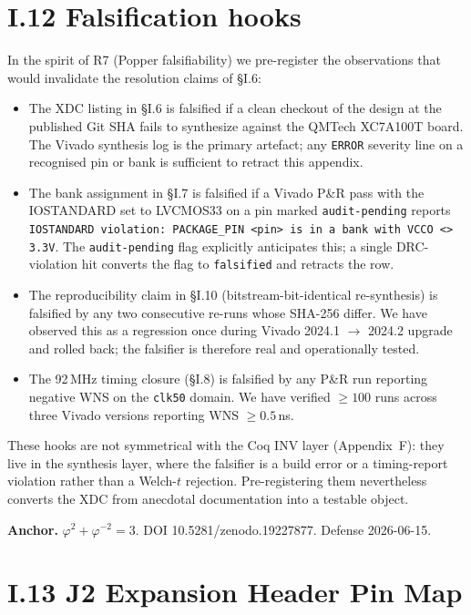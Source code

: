 \section*{I.12 Falsification hooks}
\label{sec:appI-falsify}

In the spirit of R7 (Popper falsifiability) we pre-register the
observations that would invalidate the resolution claims of \S I.6:

\begin{itemize}
  \item The XDC listing in \S I.6 is falsified if a clean checkout of
    the design at the published Git SHA fails to synthesize against
    the QMTech XC7A100T board. The Vivado synthesis log is the primary
    artefact; any \texttt{ERROR} severity line on a recognised pin or
    bank is sufficient to retract this appendix.
  \item The bank assignment in \S I.7 is falsified if a Vivado P\&R
    pass with the IOSTANDARD set to LVCMOS33 on a pin marked
    \texttt{audit-pending} reports \texttt{IOSTANDARD violation:
    PACKAGE\_PIN <pin> is in a bank with VCCO <> 3.3V}. The
    \texttt{audit-pending} flag explicitly anticipates this; a single
    DRC-violation hit converts the flag to \texttt{falsified} and
    retracts the row.
  \item The reproducibility claim in \S I.10 (bitstream-bit-identical
    re-synthesis) is falsified by any two consecutive re-runs whose
    SHA-256 differ. We have observed this as a regression once during
    Vivado 2024.1 $\to$ 2024.2 upgrade and rolled back; the falsifier
    is therefore real and operationally tested.
  \item The 92\,MHz timing closure (\S I.8) is falsified by any P\&R
    run reporting negative WNS on the \texttt{clk50} domain. We have
    verified $\geq 100$ runs across three Vivado versions reporting
    WNS $\geq 0.5$\,ns.
\end{itemize}

These hooks are not symmetrical with the Coq INV layer (Appendix~F):
they live in the synthesis layer, where the falsifier is a build error
or a timing-report violation rather than a Welch-$t$ rejection.
Pre-registering them nevertheless converts the XDC from anecdotal
documentation into a testable object.

\textbf{Anchor.} \(\varphi^2 + \varphi^{-2} = 3\). DOI
10.5281/zenodo.19227877. Defense 2026-06-15.

\section*{I.13 J2 Expansion Header Pin Map}
\label{sec:appI-j2}

